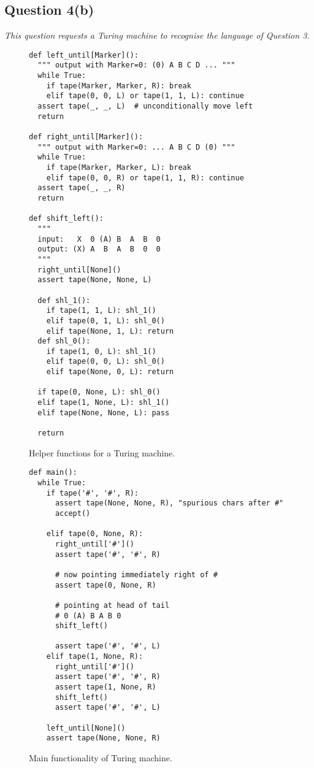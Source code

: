 \documentclass[a4paper]{article}
\begin{document}
\subsection*{Question 4(b)}
\begin{center}
  \textit{
    This question requests a Turing machine to recognise the language of Question 3.
  }
\end{center}
\begin{figure}

\begin{verbatim}
def left_until[Marker]():
  """ output with Marker=0: (0) A B C D ... """
  while True:
    if tape(Marker, Marker, R): break
    elif tape(0, 0, L) or tape(1, 1, L): continue
  assert tape(_, _, L)  # unconditionally move left
  return

def right_until[Marker]():
  """ output with Marker=0: ... A B C D (0) """
  while True:
    if tape(Marker, Marker, L): break
    elif tape(0, 0, R) or tape(1, 1, R): continue
  assert tape(_, _, R)
  return

def shift_left():
  """
  input:   X  0 (A) B  A  B  0
  output: (X) A  B  A  B  0  0
  """
  right_until[None]()
  assert tape(None, None, L)

  def shl_1():
    if tape(1, 1, L): shl_1()
    elif tape(0, 1, L): shl_0()
    elif tape(None, 1, L): return
  def shl_0():
    if tape(1, 0, L): shl_1()
    elif tape(0, 0, L): shl_0()
    elif tape(None, 0, L): return

  if tape(0, None, L): shl_0()
  elif tape(1, None, L): shl_1()
  elif tape(None, None, L): pass

  return
\end{verbatim}
  \caption{Helper functions for a Turing machine.}\label{fig:tm1}
\end{figure}


\begin{figure}

  \begin{verbatim}
def main():
  while True:
    if tape('#', '#', R):
      assert tape(None, None, R), "spurious chars after #"
      accept()

    elif tape(0, None, R):
      right_until['#']()
      assert tape('#', '#', R)

      # now pointing immediately right of #
      assert tape(0, None, R)

      # pointing at head of tail
      # 0 (A) B A B 0
      shift_left()

      assert tape('#', '#', L)
    elif tape(1, None, R):
      right_until['#']()
      assert tape('#', '#', R)
      assert tape(1, None, R)
      shift_left()
      assert tape('#', '#', L)

    left_until[None]()
    assert tape(None, None, R)
\end{verbatim}

  \caption{Main functionality of Turing machine.}\label{fig:tm2}
\end{figure}
\end{document}
